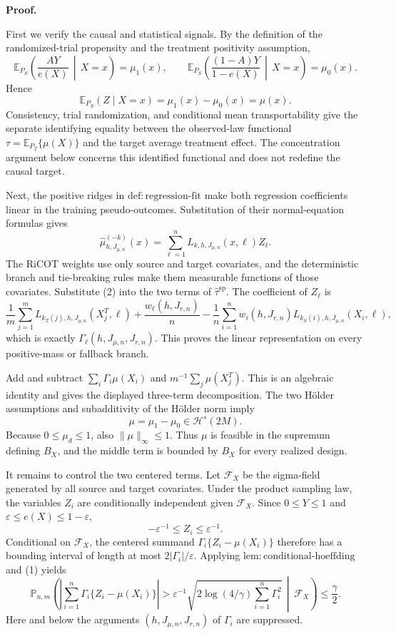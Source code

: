 \textbf{Proof.}

First we verify the causal and statistical signals. By the definition of the randomized-trial propensity and the treatment positivity assumption,
\[
\mathbb E_{P_S}\!\left(\frac{AY}{e(X)}\,\middle|\,X=x\right)=\mu_1(x),
\qquad
\mathbb E_{P_S}\!\left(\frac{(1-A)Y}{1-e(X)}\,\middle|\,X=x\right)=\mu_0(x).
\]
Hence
\[
\mathbb E_{P_S}(Z\mid X=x)=\mu_1(x)-\mu_0(x)=\mu(x).
\tag{1}
\]
Consistency, trial randomization, and conditional mean transportability give the separate identifying equality between the observed-law functional \(\tau=\mathbb E_{P_T}\{\mu(X)\}\) and the target average treatment effect. The concentration argument below concerns this identified functional and does not redefine the causal target.

Next, the positive ridges in \(\mathrm{def:regression\text{-}fit}\) make both regression coefficients linear in the training pseudo-outcomes. Substitution of their normal-equation formulas gives
\[
\widehat\mu^{(-k)}_{h,J_{\mu,n}}(x)
=\sum_{\ell=1}^nL_{k,h,J_{\mu,n}}(x,\ell)Z_\ell.
\tag{2}
\]
The RiCOT weights use only source and target covariates, and the deterministic branch and tie-breaking rules make them measurable functions of those covariates. Substitute (2) into the two terms of \(\widehat\tau^{\mathrm{sp}}\). The coefficient of \(Z_\ell\) is
\[
\frac1m\sum_{j=1}^mL_{k_T(j),h,J_{\mu,n}}(X_j^T,\ell)
+\frac{w_\ell(h,J_{r,n})}{n}
-\frac1n\sum_{i=1}^nw_i(h,J_{r,n})L_{k_S(i),h,J_{\mu,n}}(X_i,\ell),
\]
which is exactly \(\Gamma_\ell(h,J_{\mu,n},J_{r,n})\). This proves the linear representation on every positive-mass or fallback branch.

Add and subtract \(\sum_i\Gamma_i\mu(X_i)\) and \(m^{-1}\sum_j\mu(X_j^T)\). This is an algebraic identity and gives the displayed three-term decomposition. The two Hölder assumptions and subadditivity of the Hölder norm imply
\[
\mu=\mu_1-\mu_0\in\mathcal H^s(2M).
\tag{3}
\]
Because \(0\le\mu_d\le1\), also \(\|\mu\|_\infty\le1\). Thus \(\mu\) is feasible in the supremum defining \(B_X\), and the middle term is bounded by \(B_X\) for every realized design.

It remains to control the two centered terms. Let \(\mathcal F_X\) be the sigma-field generated by all source and target covariates. Under the product sampling law, the variables \(Z_i\) are conditionally independent given \(\mathcal F_X\). Since \(0\le Y\le1\) and \(\varepsilon\le e(X)\le1-\varepsilon\),
\[
-\varepsilon^{-1}\le Z_i\le\varepsilon^{-1}.
\]
Conditional on \(\mathcal F_X\), the centered summand \(\Gamma_i\{Z_i-\mu(X_i)\}\) therefore has a bounding interval of length at most \(2|\Gamma_i|/\varepsilon\). Applying \(\mathrm{lem:conditional\text{-}hoeffding}\) and (1) yields
\[
\mathbb P_{n,m}\!\left(
\left|\sum_{i=1}^n\Gamma_i\{Z_i-\mu(X_i)\}\right|>
\varepsilon^{-1}\sqrt{2\log(4/\gamma)\sum_{i=1}^n\Gamma_i^2}
\,\middle|\,\mathcal F_X\right)\le\frac\gamma2.
\tag{4}
\]
Here and below the arguments \((h,J_{\mu,n},J_{r,n})\) of \(\Gamma_i\) are suppressed.

